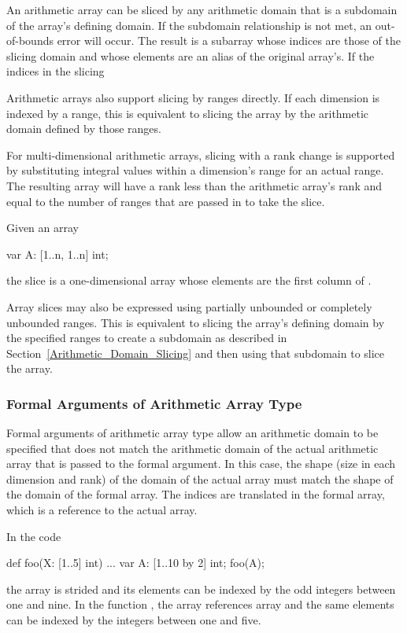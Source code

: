 An arithmetic array can be sliced by any arithmetic domain that is a
subdomain of the array's defining domain.  If the subdomain
relationship is not met, an out-of-bounds error will occur.  The
result is a subarray whose indices are those of the slicing domain and
whose elements are an alias of the original array's.  If the indices
in the slicing

Arithmetic arrays also support slicing by ranges directly.  If each
dimension is indexed by a range, this is equivalent to slicing the
array by the arithmetic domain defined by those ranges.

For multi-dimensional arithmetic arrays, slicing with a rank change is
supported by substituting integral values within a dimension's range
for an actual range.  The resulting array will have a rank less than
the arithmetic array's rank and equal to the number of ranges that are
passed in to take the slice.

\begin{example}
Given an array
\begin{chapel}
var A: [1..n, 1..n] int;
\end{chapel}
the slice  is a one-dimensional array whose elements
are the first column of .
\end{example}

Array slices may also be expressed using partially unbounded or
completely unbounded ranges.  This is equivalent to slicing the
array's defining domain by the specified ranges to create a subdomain
as described in Section~\ref{Arithmetic_Domain_Slicing} and then using
that subdomain to slice the array.

\subsubsection{Formal Arguments of Arithmetic Array Type}
\label{Formal_Arguments_of_Arithmetic_Array_Type}

Formal arguments of arithmetic array type allow an arithmetic domain
to be specified that does not match the arithmetic domain of the
actual arithmetic array that is passed to the formal argument.  In
this case, the shape (size in each dimension and rank) of the domain
of the actual array must match the shape of the domain of the formal
array.  The indices are translated in the formal array, which is a
reference to the actual array.

\begin{example}
In the code
\begin{chapel}
def foo(X: [1..5] int) { ... }
var A: [1..10 by 2] int;
foo(A);
\end{chapel}
the array  is strided and its elements can be indexed by the
odd integers between one and nine.  In the function , the
array  references array  and the same elements can be
indexed by the integers between one and five.
\end{example}

